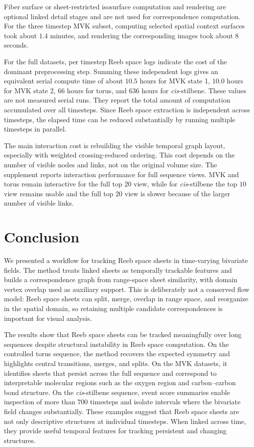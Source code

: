 \documentclass[review]{vgtc}                          %
\begin{document}
Fiber surface or sheet-restricted isosurface computation and rendering are optional linked detail stages and are not used for correspondence computation. For the three timestep MVK subset, computing selected spatial context surfaces took about $1.4$ minutes, and rendering the corresponding images took about $8$ seconds.

For the full datasets, per timestep Reeb space logs indicate the cost of the dominant preprocessing step. Summing these independent logs gives an equivalent serial compute time of about $10.5$ hours for MVK state 1, $10.0$ hours for MVK state 2, $66$ hours for torus, and $636$ hours for \textit{cis}-stilbene. These values are not measured serial runs. They report the total amount of computation accumulated over all timesteps. Since Reeb space extraction is independent across timesteps, the elapsed time can be reduced substantially by running multiple timesteps in parallel.

The main interaction cost is rebuilding the visible temporal graph layout, especially with weighted crossing-reduced ordering. This cost depends on the number of visible nodes and links, not on the original volume size. The supplement reports interaction performance for full sequence views. MVK and torus remain interactive for the full top $20$ view, while for \textit{cis}-stilbene the top $10$ view remains usable and the full top $20$ view is slower because of the larger number of visible links.

\section{Conclusion}
We presented a workflow for tracking Reeb space sheets in time-varying bivariate fields. The method treats linked sheets as temporally trackable features and builds a correspondence graph from range-space sheet similarity, with domain vertex overlap used as auxiliary support. This is deliberately not a conserved flow model: Reeb space sheets can split, merge, overlap in range space, and reorganize in the spatial domain, so retaining multiple candidate correspondences is important for visual analysis.

The results show that Reeb space sheets can be tracked meaningfully over long sequences despite structural instability in Reeb space computation. On the controlled torus sequence, the method recovers the expected symmetry and highlights central transitions, merges, and splits. On the MVK datasets, it identifies sheets that persist across the full sequence and correspond to interpretable molecular regions such as the oxygen region and carbon--carbon bond structure. On the \textit{cis}-stilbene sequence, event score summaries enable inspection of more than $700$ timesteps and isolate intervals where the bivariate field changes substantially. These examples suggest that Reeb space sheets are not only descriptive structures at individual timesteps. When linked across time, they provide useful temporal features for tracking persistent and changing structures.
\end{document}

